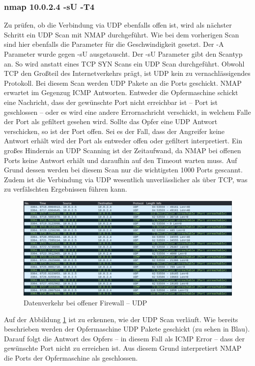 \subsubsection{nmap 10.0.2.4 -sU -T4}
 Zu prüfen, ob die Verbindung via UDP ebenfalls offen ist, wird als nächster Schritt ein UDP Scan mit NMAP durchgeführt. Wie bei dem vorherigen Scan sind hier ebenfalls die Parameter für die Geschwindigkeit gesetzt. Der -A Parameter wurde gegen -sU ausgetauscht. Der -sU Parameter gibt den Scantyp an. So wird anstatt eines TCP SYN Scans ein UDP Scan durchgeführt. Obwohl TCP den Großteil des Internetverkehrs prägt, ist UDP kein zu vernachlässigendes Protokoll. Bei diesem Scan werden UDP Pakete an die Ports geschickt. NMAP erwartet im Gegenzug ICMP Antworten. Entweder die Opfermaschine schickt eine Nachricht, dass der gewünschte Port nicht erreichbar ist – Port ist geschlossen – oder es wird eine andere Errornachricht verschickt, in welchem Falle der Port als gefiltert gesehen wird. Sollte das Opfer eine UDP Antwort verschicken, so ist der Port offen. Sei es der Fall, dass der Angreifer keine Antwort erhält wird der Port als entweder offen oder gefiltert interpretiert. 
Ein großes Hindernis an UDP Scanning ist der Zeitaufwand, da NMAP bei offenen Ports keine Antwort erhält und daraufhin auf den Timeout warten muss. Auf Grund dessen werden bei diesem Scan nur die wichtigsten 1000 Ports gescannt. Zudem ist die Verbindung via UDP wesentlich unverlässlicher als über TCP, was zu verfälschten Ergebnissen führen kann.

\begin{figure}
	\includegraphics[width=\linewidth]{img/ws_firewall_open_udp.png}
	\caption{Datenverkehr bei offener Firewall – UDP}
	\label{fig:ws_firewall_open_udp}
\end{figure}

Auf der Abbildung \ref{fig:ws_firewall_open_udp} ist zu erkennen, wie der UDP Scan verläuft. Wie bereits beschrieben werden der Opfermaschine UDP Pakete geschickt (zu sehen in Blau). Darauf folgt die Antwort des Opfers – in diesem Fall als ICMP Error – dass der gewünschte Port nicht zu erreichen ist. Aus diesem Grund interpretiert NMAP die Ports der Opfermaschine als geschlossen. \newpage


